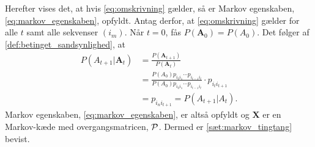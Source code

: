 \begin{bev}

Herefter vises det, at hvis \eqref{eq:omskrivning} gælder, så er Markov egenskaben, \eqref{eq:markov_egenskaben}, opfyldt. Antag derfor, at \eqref{eq:omskrivning} gælder for alle $t$ samt alle sekvenser $(i_m)$. Når $t = 0$, fås $P(\bm A_0)=P(A_0)$. Det følger af \autoref{def:betinget_sandsynlighed}, at
\begin{align*}
    P(A_{t+1}|\bm A_t)&=\frac{P(\bm A_{t+1})}{P(\bm A_t)}\\
    &= \frac{P(A_0)p_{i_0i_1}\cdots p_{i_{t-1}i_t}}{P(A_0)p_{i_0i_1}\cdots p_{i_{t-1}i_t}}\cdot p_{i_{t}i_{t+1}}
    \\
    &=p_{i_ni_{t+1}} = P(A_{t+1} | A_t).
\end{align*}
Markov egenskaben, \eqref{eq:markov_egenskaben}, er altså opfyldt og $\bm X$ er en Markov-kæde med overgangsmatricen, $\P$. Dermed er \autoref{sæt:markov_tingtang} bevist.










\end{bev}
